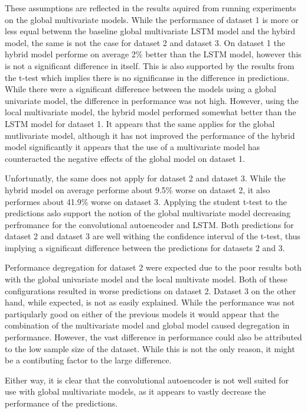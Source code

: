 These assumptions are reflected in the results aquired from running experiments on the global multivariate models.
While the performance of dataset 1 is more or less equal betwenn the baseline global multivariate LSTM model and the hybird model,
the same is not the case for dataset 2 and dataset 3.
On dataset 1 the hybrid model performe on average 2\% better than the LSTM model, however this is not a significant difference in itself.
This is also supported by the results from the t-test which implies there is no significanse in the difference in predictions.
While there were a significant difference between the models using a global univariate model, the difference in performance was not high.
However, using the local multivariate model, the hybrid model performed somewhat better than the LSTM model for dataset 1.
It appears that the same applies for the global mutlivariate model, although it has not improved the performance of the hybrid model significantly
it appears that the use of a multivariate model has counteracted the negative effects of the global model on dataset 1.

Unfortunatly, the same does not apply for dataset 2 and dataset 3.
While the hybrid model on average performe about 9.5\% worse on dataset 2, it also performes about 41.9\% worse on dataset 3.
Applying the student t-test to the predictions aslo support the notion of the global multivariate model decreasing perfromance for the
convolutional autoencoder and LSTM.
Both predictions for dataset 2 and dataset 3 are well withing the confidence interval of the t-test,
thus implying a significant difference between the predictions for datasets 2 and 3.

Performance degregation for dataset 2 were expected due to the poor results both with the global univariate model and the local multivate model.
Both of these configurations resulted in worse predictions on dataset 2.
Dataset 3 on the other hand, while expected, is not as easily explained.
While the performance was not partiqularly good on either of the previous models it would appear that the combination of the multivariate model and global model
caused degregation in performance.
However, the vast difference in performance could also be attributed to the low sample size of the dataset.
While this is not the only reason, it might be a contibuting factor to the large difference. 

Either way, it is clear that the convolutional autoencoder is not well suited for use with global multivariate models, as it appears to
vastly decrease the performance of the predictions.




